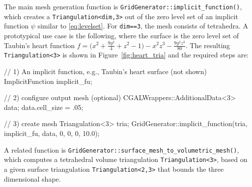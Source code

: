 \documentclass{ansarticle-preprint}
\begin{document}
The main mesh generation function is
\texttt{GridGenerator::implicit\_function()}, which creates a \texttt{Triangulation<dim,3>} out of the zero level set of an implicit function $\psi$ similar to \eqref{eq:levelset}.
For \texttt{dim==3}, the mesh consists of tetrahedra. A prototypical use case is the following, where the surface is the zero level set of Taubin's heart function $f=\bigl ( x^2 + \frac{9y^2}{4} +z^2 -1 \bigr ) -x^2 z^3 - \frac{9y^2z^3}{80}$. The resulting \texttt{Triangulation<3>} is shown in Figure~\ref{fig:heart_tria}
and the required steps are:
\begin{c++}
// 1) An implicit function, e.g., Taubin's heart surface (not shown)
ImplicitFunction implicit_fu;

// 2) configure output mesh (optional)
CGALWrappers::AdditionalData<3> data; data.cell_size = .05;

// 3) create mesh
Triangulation<3>  tria;
GridGenerator::implicit_function(tria, implicit_fu, data, {0, 0, 0}, 10.0);
\end{c++}

A related function is
\texttt{GridGenerator::surface\_mesh\_to\_volumetric\_mesh()}, which
computes a tetrahedral volume triangulation \texttt{Triangulation<3>}, based on a
given surface triangulation \texttt{Triangulation<2,3>} that bounds
the three dimensional shape.
\end{document}
